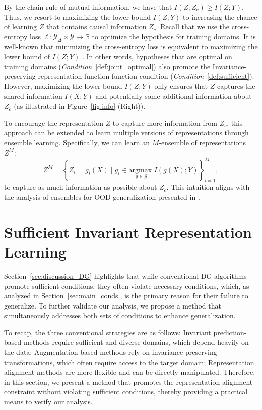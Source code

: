 By the chain rule of mutual information, we have that $I(Z; Z_c) \ge I(Z; Y)$. Thus, we resort to maximizing the lower bound $I(Z; Y)$ to increasing the chance of learning $Z$ that contains causal information $Z_c$. 
Recall that we use the cross-entropy loss \(\ell:\mathcal{Y}_{\Delta} \times \mathcal{Y} \mapsto \mathbb{R}\) to optimize the hypothesis for training domains. It is well-known that minimizing the cross-entropy loss is equivalent to maximizing the lower bound of \(I(Z; Y)\) \citep{qin2019rethinking, colombo2021novel}. In other words, hypotheses that are optimal on training domains (\textit{Condition}~\ref{def:joint_optimal}) also promote the Invariance-preserving representation function function condition (\textit{Condition}~\ref{def:sufficient}). However, maximizing the lower bound \(I(Z; Y)\) only ensures that \(Z\) captures the shared information \(I(X; Y)\) and potentially some additional information about \(Z_c\) (as illustrated in Figure~\ref{fig:info} (Right)).

To encourage the representation \(Z\) to capture more information from \(Z_c\), this approach can be extended to learn multiple versions of representations through ensemble learning. Specifically, we can learn an \(M\)-ensemble of representations \(Z^M\):
\[
Z^M = \left\{Z_i = g_i(X) \mid g_i \in \underset{g\in \mathcal{G}}{\text{argmax }} I(g(X); Y) \right\}_{i=1}^{M},
\]
to capture as much information as possible about \(Z_c\). This intuition aligns with the analysis of ensembles for OOD generalization presented in \cite{rame2022diverse}.



\section{Sufficient Invariant Representation Learning}
\label{sec:main_proposed_method}

Section~\ref{sec:discussion_DG} highlights that while conventional DG algorithms promote sufficient conditions, they often violate necessary conditions, which, as analyzed in Section~\ref{sec:main_conds}, is the primary reason for their failure to generalize. To further validate our analysis, we propose a method that simultaneously addresses both sets of conditions to enhance generalization.

To recap, the three conventional strategies are as follows: Invariant prediction-based methods require sufficient and diverse domains, which depend heavily on the data;
Augmentation-based methods rely on invariance-preserving transformations, which often require access to the target domain;
Representation alignment methods are more flexible and can be directly manipulated. Therefore, in this section, we present a method that promotes the representation alignment constraint without violating sufficient conditions, thereby providing a practical means to verify our analysis.




